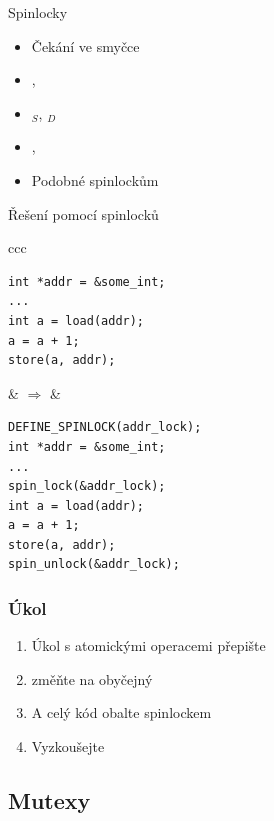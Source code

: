 \begin{frame}[fragile]{Spinlocky}

  \begin{itemize}
    \item Čekání ve smyčce
    \item {}, 
    \item {}$_S$, $_D$

    \pause

    \item {}, 
    \item Podobné  spinlockům
  \end{itemize}

  \pause

  \begin{block}{Řešení pomocí spinlocků}
  \begin{center}
  \begin{tabular}{ccc}
  \begin{lstlisting}
int *addr = &some_int;
...
int a = load(addr);
a = a + 1;
store(a, addr);
  \end{lstlisting} & $\Rightarrow$ &
  \begin{lstlisting}
DEFINE_SPINLOCK(addr_lock);
int *addr = &some_int;
...
spin_lock(&addr_lock);
int a = load(addr);
a = a + 1;
store(a, addr);
spin_unlock(&addr_lock);
  \end{lstlisting}
  \end{tabular}
  \end{center}
  \end{block}

\end{frame}

\begin{frame}
  \frametitle{Úkol}

  \begin{enumerate}
  \item Úkol s atomickými operacemi přepište
  \item {} změňte na obyčejný 
  \item A celý kód obalte spinlockem
  \item Vyzkoušejte
  \end{enumerate}

\end{frame}

\iffimuni
\subsection{Mutexy}
\fi

